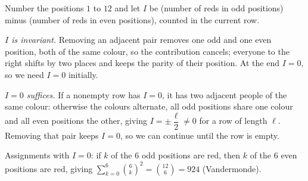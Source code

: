 Number the positions $1$ to $12$ and let $I$ be (number of reds in odd positions) minus (number of reds in even positions), counted in the current row.

\emph{$I$ is invariant.} Removing an adjacent pair removes one odd and one even position, both of the same colour, so the contribution cancels; everyone to the right shifts by two places and keeps the parity of their position. At the end $I=0$, so we need $I=0$ initially.

\emph{$I=0$ suffices.} If a nonempty row has $I=0$, it has two adjacent people of the same colour: otherwise the colours alternate, all odd positions share one colour and all even positions the other, giving $I=\pm\dfrac{\ell}2\ne0$ for a row of length $\ell$. Removing that pair keeps $I=0$, so we can continue until the row is empty.

Assignments with $I=0$: if $k$ of the $6$ odd positions are red, then $k$ of the $6$ even positions are red, giving $\sum_{k=0}^6\binom6k^2=\binom{12}6=\boxed{924}$ (Vandermonde).
